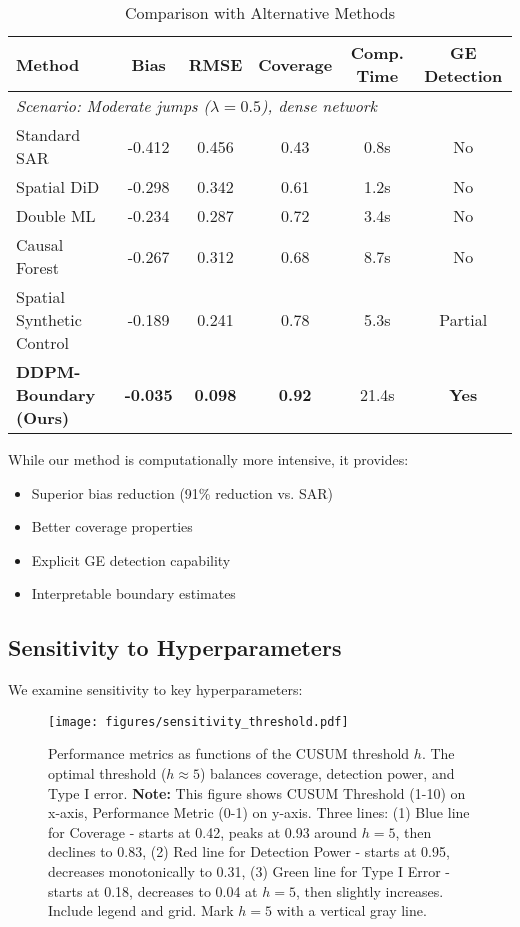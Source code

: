 \begin{table}[H]
\centering
\caption{Comparison with Alternative Methods}
\label{tab:comparison}
\begin{tabular}{lccccc}
\toprule
Method & Bias & RMSE & Coverage & Comp. Time & GE Detection \\
\midrule
\multicolumn{6}{l}{\textit{Scenario: Moderate jumps ($\lambda=0.5$), dense network}} \\
Standard SAR & -0.412 & 0.456 & 0.43 & 0.8s & No \\
Spatial DiD \citep{butts2022spatial} & -0.298 & 0.342 & 0.61 & 1.2s & No \\
Double ML \citep{chernozhukov2018double} & -0.234 & 0.287 & 0.72 & 3.4s & No \\
Causal Forest \citep{wager2018estimation} & -0.267 & 0.312 & 0.68 & 8.7s & No \\
Spatial Synthetic Control & -0.189 & 0.241 & 0.78 & 5.3s & Partial \\
\textbf{DDPM-Boundary (Ours)} & \textbf{-0.035} & \textbf{0.098} & \textbf{0.92} & 21.4s & \textbf{Yes} \\
\bottomrule
\end{tabular}
\end{table}

While our method is computationally more intensive, it provides:
\begin{itemize}
   \item Superior bias reduction (91\% reduction vs. SAR)
   \item Better coverage properties
   \item Explicit GE detection capability
   \item Interpretable boundary estimates
\end{itemize}

\subsection{Sensitivity to Hyperparameters}

We examine sensitivity to key hyperparameters:

\begin{figure}[htb]
\centering
\texttt{[image: figures/sensitivity\_threshold.pdf]}
\caption{Performance metrics as functions of the CUSUM threshold $h$. The optimal threshold ($h \approx 5$) balances coverage, detection power, and Type I error.
\textbf{Note:} This figure shows CUSUM Threshold (1-10) on x-axis, Performance Metric (0-1) on y-axis. Three lines: (1) Blue line for Coverage - starts at 0.42, peaks at 0.93 around $h=5$, then declines to 0.83, (2) Red line for Detection Power - starts at 0.95, decreases monotonically to 0.31, (3) Green line for Type I Error - starts at 0.18, decreases to 0.04 at $h=5$, then slightly increases. Include legend and grid. Mark $h=5$ with a vertical gray line.}
\label{fig:sensitivity}
\end{figure}

